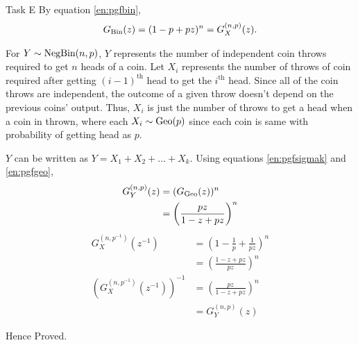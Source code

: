 \begin{task}{ Task E }
	By equation \ref{en:pgfbin},
	\begin{align}
		G_{\text{Bin}}(z) = (1-p + pz)^n = G_X^{(n,p)}(z).
	\end{align}

	For $Y\sim\text{NegBin}(n,p)$, $Y$ represents the number of independent coin
	throws required to get $n$ heads of a coin. Let $X_i$ represents the
	number of throws of coin required after getting $(i-1)^\text{th}$ head
	to get the $i^\text{th}$ head. Since all of the coin throws are
	independent, the outcome of a given throw doesn't depend on the
	previous coins' output. Thus, $X_i$ is just the number of throws to get
	a head when a coin in thrown, where each $X_i\sim\text{Geo}(p)$ since each
	coin is same with probability of getting head as $p$.

	$Y$ can be written as $Y=X_1+X_2+\dots+X_k$. Using equations
	\ref{en:pgfsigmak} and \ref{en:pgfgeo},
	\begin{align}
		G_Y^{(n,p)}(z) & = (G_{\text{Geo}}(z))^n                    \\
		               & = \left(\frac{pz}{1-z+pz}\right)^n \\
		\label{en:pgfnegbin}
	\end{align}
	\begin{align}
		G_X^{(n,p^{-1})}(z^{-1})                   & =
		\left(1-\frac{1}{p} + \frac{1}{pz}\right)^n                   \\
		                                           & =
		\left(\frac{1-z+pz}{pz}\right)^n
		\\
		\left(G_X^{(n,p^{-1})}(z^{-1})\right)^{-1} & =
		\left(\frac{pz}{1-z+pz}\right)^n
		\\
		                                           & = G_Y^{(n,p)}(z)
	\end{align}

	Hence Proved.
\end{task}




